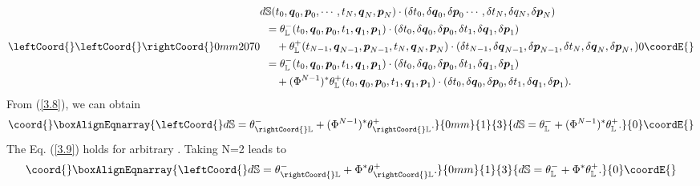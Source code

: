\documentclass[a4paper,a4paper]{article}
\def\q{\boldsymbol{q}}
\def\p{\boldsymbol{p}}
\begin{document}
\begin{align}
{\begin{split}
\leftCoord{}\leftCoord{}\rightCoord{}\end{split}
}{0mm}{20}{70}{
\begin{split}
 d&\mathbb{S}(t_{0}, \q_{0}, \p_{0}, \cdots, t_{N}, \q_{N}, \p_{N})\cdot
               (\delta t_{0}, \delta \q_{0}, \delta \p_{0}\cdots, \delta t_{N},
               \delta q_{N}, \delta \p_{N})\\
&=\theta_{\mathbb{L}}^{-}(t_{0}, \q_{0}, \p_{0}, t_{1}, \q_{1}, \p_{1})\cdot
                 (\delta t_{0}, \delta \q_{0},  \delta \p_{0}, \delta t_{1},
                 \delta \q_{1}, \delta \p_{1})\\
&\quad +\theta_{\mathbb{L}}^{+}(t_{N-1}, \q_{N-1}, \p_{N-1},
         t_{N}, \q_{N}, \p_{N})\cdot
         (\delta t_{N-1}, \delta \q_{N-1},  \delta \p_{N-1}, \delta t_{N},
         \delta \q_{N}, \delta \p_{N},)\\
&=\theta_{\mathbb{L}}^{-}(t_{0}, \q_{0}, \p_{0}, t_{1}, \q_{1}, \p_{1})\cdot
    (\delta t_{0}, \delta \q_{0},  \delta \p_{0}, \delta t_{1},
                 \delta \q_{1}, \delta \p_{1})\\
&\quad +(\Phi^{N-1})^{*}\theta_{\mathbb{L}}^{+}(t_{0}, \q_{0}, \p_{0}, t_{1},
              \q_{1}, \p_{1})\cdot
    (\delta t_{0}, \delta \q_{0},  \delta \p_{0}, \delta t_{1},
                 \delta \q_{1}, \delta \p_{1}). \end{split}
}{0}\coordE{}\end{align}
From (\ref{3.8}), we can obtain
\begin{align}\coord{}\boxAlignEqnarray{
\leftCoord{}d\mathbb{S}=\theta_{\rightCoord{}\mathbb{L}}^{-}+(\Phi^{N-1})^{*}\theta_{\rightCoord{}\mathbb{L}}^{+}.
\label{3.9}
}{0mm}{1}{3}{
d\mathbb{S}=\theta_{\mathbb{L}}^{-}+(\Phi^{N-1})^{*}\theta_{\mathbb{L}}^{+}.
}{0}\coordE{}\end{align}
The Eq. (\ref{3.9}) holds for arbitrary \coordHE{}. Taking N=2 leads to
\begin{align}\coord{}\boxAlignEqnarray{
\leftCoord{}d\mathbb{S}=\theta_{\rightCoord{}\mathbb{L}}^{-}+\Phi^{*}\theta_{\rightCoord{}\mathbb{L}}^{+}.
\label{3.10}
}{0mm}{1}{3}{
d\mathbb{S}=\theta_{\mathbb{L}}^{-}+\Phi^{*}\theta_{\mathbb{L}}^{+}.
}{0}\coordE{}\end{align}
\end{document}
